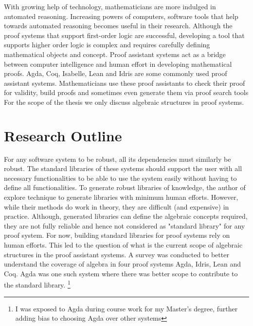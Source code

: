 With growing help of technology, mathematicians are more indulged in automated
reasoning. Increasing powers of computers, software tools that help towards
automated reasoning becomes useful in their research. Although the proof systems
that support first-order logic are successful, developing a tool that supports
higher order logic is complex \cite{phillips2010automated} and requires
carefully defining mathematical objects and concept. Proof assistant systems act
as a bridge between computer intelligence and human effort in developing
mathematical proofs. Agda, Coq, Isabelle, Lean and Idris are some commonly used
proof assistant systems. Mathematicians use these proof assistants to check their
proof for validity, build proofs and sometimes even generate them via proof
search tools  For the scope of the thesis we only discuss algebraic
structures in proof systems.

\section{Research Outline}
For any software system to be robust, all its dependencies must similarly be
robust. The standard libraries of these systems should support the user with all
necessary functionalities to be able to use the system easily without having to
define all functionalities. To generate robust libraries of knowledge, the
author of \cite{BuildingDiamond} explore technique to generate libraries with
minimum human efforts. However, while their methods do work in theory, they are
difficult (and expensive) in practice. Although, generated libraries can define
the algebraic concepts required, they are not fully reliable and hence not
considered as "standard library" for any proof system. For now, building
standard libraries for proof systems rely on human efforts. This led to the
question of what is the current scope of algebraic structures in the proof
assistant systems. A survey was conducted to better understand the coverage of
algebra in four proof systems Agda, Idris, Lean and Coq. Agda was one such
system where there was better scope to contribute to the standard library.
\footnote{I was exposed to Agda during course work for my Master's degree,
further adding bias to choosing Agda over other systems} 

